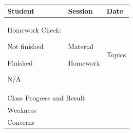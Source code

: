 \documentclass[11pt]{article}
\newcommand{\rowspace}{0.22}
\begin{document}
\begin{center}
\bf
\renewcommand{\arraystretch}{2}
\begin{tabular}{|p{}|p{}|p{}|}
\hline
Student&Session&Date\\
\hline
\begin{minipage}{.5\textwidth}
   \vspace{.5em}
   Homework Check:
   
   \raisebox{-.15em}{\scalebox{1.5}{$\square$}} Not finished 
   
    \raisebox{-.15em}{\scalebox{1.5}{$\square$}} Finished 
    
     \raisebox{-.15em}{\scalebox{1.5}{$\square$}} N/A
     \vspace{5.5em}
\end{minipage} &
\begin{minipage}{.5\textwidth}
   \vspace{.5em}
   Material
   \vspace{4em}
   
   Homework
    \vspace{4em}
\end{minipage}&
\begin{minipage}{.5\textwidth}
   \vspace{.5em}
   Topics
   \vspace{9em}
\end{minipage} \\
\hline
\multicolumn{3}{|l|}{
\begin{minipage}{.5\textwidth}
   \vspace{1em}
   Class Progress and Result
   \vspace{\rowspace\paperheight}
\end{minipage}}\\
\hline
\multicolumn{3}{|l|}{
\begin{minipage}{.5\textwidth}
   \vspace{.5em}
   Weakness
   \vspace{\rowspace\paperheight}
\end{minipage}}\\
\hline
\multicolumn{3}{|l|}{
\begin{minipage}{.5\textwidth}
   \vspace{.5em}
   Concerns
   \vspace{\rowspace\paperheight}
\end{minipage}}\\
\hline
\end{tabular}
\end{center}
\end{document}
